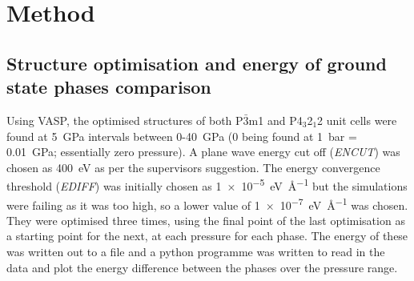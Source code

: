 \documentclass[a4paper,12pt]{article}
\begin{document}
\section{Method}
%
%
%

\subsection{Structure optimisation and energy of ground state phases comparison}
Using VASP, the optimised structures of both P$\bar{3}$m1 and P4$_3$2$_1$2 unit cells were found at \SI{5}{\GPa} intervals between 0-\SI{40}{\GPa} (0 being found at \SI{1}{\bar} = \SI{0.01}{\GPa}; essentially zero pressure). A plane wave energy cut off (\textit{ENCUT}) was chosen as \SI{400}{\eV} as per the supervisors suggestion. The energy convergence threshold (\textit{EDIFF}) was initially chosen as \SI{1e-5}{\eV \AA ^{-1}} but the simulations were failing as it was too high, so a lower value of \SI{1e-7}{\eV \AA ^{-1}} was chosen. They were optimised three times, using the final point of the last optimisation as a starting point for the next, at each pressure for each phase. The energy of these was written out to a file and a python programme was written to read in the data and plot the energy difference between the phases over the pressure range.
\end{document}
